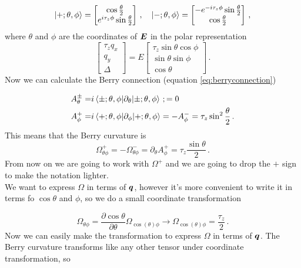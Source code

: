 \begin{equation}
    \ket{+;\theta,\phi}=
    \begin{bmatrix}
        \cos{\frac \theta 2}\\
        e^{i\tau_z\phi}\sin{\frac \theta 2}
    \end{bmatrix}\,,
    \quad
    \ket{-;\theta,\phi}=
    \begin{bmatrix}
        -e^{-i\tau_z\phi}\sin{\frac \theta 2}\\
        \cos{\frac \theta 2}
    \end{bmatrix}\,,
\end{equation}
where $\theta$ and $\phi$ are the coordinates of $\boldsymbol{E}$ in the polar representation
\begin{equation}
    \begin{bmatrix}
        \tau_z q_x\\
        q_y\\
        \Delta
    \end{bmatrix}=
    E
    \begin{bmatrix}
        \tau_z \sin\theta \cos\phi\\
        \sin\theta \sin\phi\\
        \cos\theta
    \end{bmatrix}\,.
\end{equation}
Now we can calculate the Berry connection (equation \ref{eq:berryconnection})

\begin{equation}
\begin{split}
    A_\theta^\pm=&
    i\braket{\pm;\theta,\phi}{\partial_\theta|\pm;\theta,\phi}\,;
    =0 \\
    A_\phi^+=&i\braket{+;\theta,\phi}{\partial_\phi|+;\theta,\phi}=-A_\phi^-=\tau_z\sin^2\frac \theta 2\,.
\end{split}
\end{equation}
This means that the Berry curvature is
\begin{equation}
    \Omega^+_{\theta\phi}=-\Omega^-_{\theta\phi}=\partial_\theta A^+_\phi=\tau_z\frac{\sin \theta}2\,.
\end{equation}
From now on we are going to work with $\Omega^+$ and we are going to drop the $+$ sign to make the notation lighter.\\
We want to express $\Omega$ in terms of $\boldsymbol{q}$, however it's more convenient to write it in terms fo  $\cos \theta$ and $\phi$, so we do a small coordinate transformation


\begin{equation}
    \Omega_{\theta\phi}=\frac{\partial\cos\theta}{\partial \theta}\Omega_{\cos(\theta)\phi} \rightarrow \Omega_{\cos(\theta)\phi}=\frac {\tau_z}2\,.
\end{equation}
Now we can easily make the transformation to express $\Omega$ in terms of $\boldsymbol{q}$. The Berry curvature transforms like any other tensor under coordinate transformation, so

